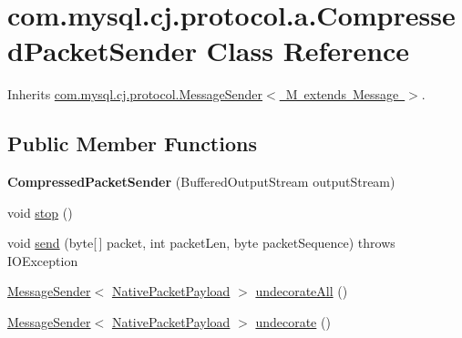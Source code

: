 \hypertarget{classcom_1_1mysql_1_1cj_1_1protocol_1_1a_1_1_compressed_packet_sender}{}\section{com.\+mysql.\+cj.\+protocol.\+a.\+Compressed\+Packet\+Sender Class Reference}
\label{classcom_1_1mysql_1_1cj_1_1protocol_1_1a_1_1_compressed_packet_sender}


Inherits \mbox{\hyperlink{interfacecom_1_1mysql_1_1cj_1_1protocol_1_1_message_sender}{com.\+mysql.\+cj.\+protocol.\+Message\+Sender$<$ M extends Message $>$}}.

\subsection*{Public Member Functions}
\begin{DoxyCompactItemize}
\item 
\mbox{\label{classcom_1_1mysql_1_1cj_1_1protocol_1_1a_1_1_compressed_packet_sender_ab6d47e91936124c65c9c980ed73af907}} 
{\bfseries Compressed\+Packet\+Sender} (Buffered\+Output\+Stream output\+Stream)
\item 
void \mbox{\hyperlink{classcom_1_1mysql_1_1cj_1_1protocol_1_1a_1_1_compressed_packet_sender_a5491c16d427d8343f0417b9e5bebd1f1}{stop}} ()
\item 
void \mbox{\hyperlink{classcom_1_1mysql_1_1cj_1_1protocol_1_1a_1_1_compressed_packet_sender_a643c7e9a053e2704786f8319ef8a06e7}{send}} (byte\mbox{[}$\,$\mbox{]} packet, int packet\+Len, byte packet\+Sequence)  throws I\+O\+Exception 
\item 
\mbox{\hyperlink{interfacecom_1_1mysql_1_1cj_1_1protocol_1_1_message_sender}{Message\+Sender}}$<$ \mbox{\hyperlink{classcom_1_1mysql_1_1cj_1_1protocol_1_1a_1_1_native_packet_payload}{Native\+Packet\+Payload}} $>$ \mbox{\hyperlink{classcom_1_1mysql_1_1cj_1_1protocol_1_1a_1_1_compressed_packet_sender_a06ec74d67adf77498b1f95148cd59323}{undecorate\+All}} ()
\item 
\mbox{\hyperlink{interfacecom_1_1mysql_1_1cj_1_1protocol_1_1_message_sender}{Message\+Sender}}$<$ \mbox{\hyperlink{classcom_1_1mysql_1_1cj_1_1protocol_1_1a_1_1_native_packet_payload}{Native\+Packet\+Payload}} $>$ \mbox{\hyperlink{classcom_1_1mysql_1_1cj_1_1protocol_1_1a_1_1_compressed_packet_sender_a3784dddfd77b45c384a6bb19f67fc2cc}{undecorate}} ()
\end{DoxyCompactItemize}

